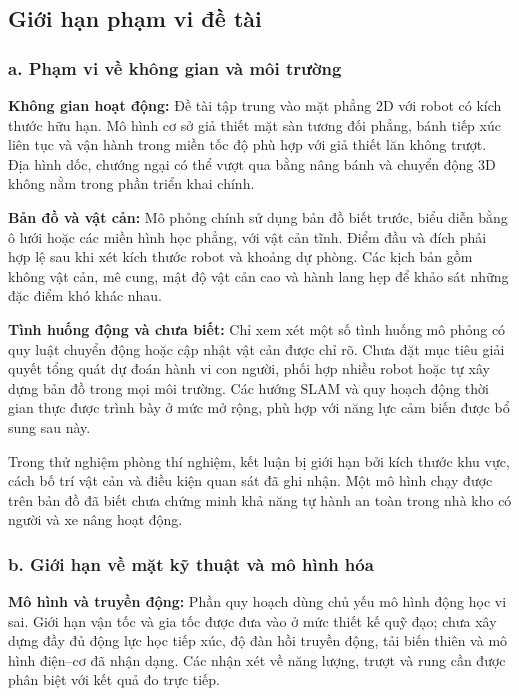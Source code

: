 \documentclass[12pt,a4paper,oneside]{report}
\begin{document}
\subsection{Giới hạn phạm vi đề tài}

\subsubsection*{a. Phạm vi về không gian và môi trường}

\textbf{Không gian hoạt động:} Đề tài tập trung vào mặt phẳng 2D với robot có kích thước hữu hạn. Mô hình cơ sở giả thiết mặt sàn tương đối phẳng, bánh tiếp xúc liên tục và vận hành trong miền tốc độ phù hợp với giả thiết lăn không trượt. Địa hình dốc, chướng ngại có thể vượt qua bằng nâng bánh và chuyển động 3D không nằm trong phần triển khai chính.

\textbf{Bản đồ và vật cản:} Mô phỏng chính sử dụng bản đồ biết trước, biểu diễn bằng ô lưới hoặc các miền hình học phẳng, với vật cản tĩnh. Điểm đầu và đích phải hợp lệ sau khi xét kích thước robot và khoảng dự phòng. Các kịch bản gồm không vật cản, mê cung, mật độ vật cản cao và hành lang hẹp để khảo sát những đặc điểm khó khác nhau.

\textbf{Tình huống động và chưa biết:} Chỉ xem xét một số tình huống mô phỏng có quy luật chuyển động hoặc cập nhật vật cản được chỉ rõ. Chưa đặt mục tiêu giải quyết tổng quát dự đoán hành vi con người, phối hợp nhiều robot hoặc tự xây dựng bản đồ trong mọi môi trường. Các hướng SLAM và quy hoạch động thời gian thực được trình bày ở mức mở rộng, phù hợp với năng lực cảm biến được bổ sung sau này.

Trong thử nghiệm phòng thí nghiệm, kết luận bị giới hạn bởi kích thước khu vực, cách bố trí vật cản và điều kiện quan sát đã ghi nhận. Một mô hình chạy được trên bản đồ đã biết chưa chứng minh khả năng tự hành an toàn trong nhà kho có người và xe nâng hoạt động.

\subsubsection*{b. Giới hạn về mặt kỹ thuật và mô hình hóa}

\textbf{Mô hình và truyền động:} Phần quy hoạch dùng chủ yếu mô hình động học vi sai. Giới hạn vận tốc và gia tốc được đưa vào ở mức thiết kế quỹ đạo; chưa xây dựng đầy đủ động lực học tiếp xúc, độ đàn hồi truyền động, tải biến thiên và mô hình điện--cơ đã nhận dạng. Các nhận xét về năng lượng, trượt và rung cần được phân biệt với kết quả đo trực tiếp.
\end{document}
